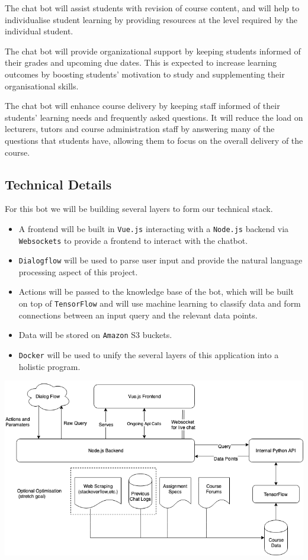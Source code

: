 \documentclass{article}
\begin{document}
The chat bot will assist students with revision of course content, and will help to individualise student learning by providing resources at the level required by the individual student.

The chat bot will provide organizational support by keeping students informed of their grades and upcoming due dates. This is expected to increase learning outcomes by boosting students' motivation to study and supplementing their organisational skills.

The chat bot will enhance course delivery by keeping staff informed of their students' learning needs and frequently asked questions. It will reduce the load on lecturers, tutors and course administration staff by answering many of the questions that students have, allowing them to focus on the overall delivery of the course. 


\subsection{Technical Details}

For this bot we will be building several layers to form our technical stack.

\begin{itemize}
  \item A frontend will be built in \texttt{Vue.js} interacting with a \texttt{Node.js} backend via \texttt{Websockets} to provide a frontend to interact with the chatbot.
  \item \texttt{Dialogflow} will be used to parse user input and provide the natural language processing aspect of this project.
  \item Actions will be passed to the knowledge base of the bot, which will be built on top of \texttt{TensorFlow} and will use machine learning to classify data and form connections between an input query and the relevant data points.
  \item Data will be stored on \texttt{Amazon} S3 buckets.
  \item \texttt{Docker} will be used to unify the several layers of this application into a holistic program. %
\end{itemize}

\begin{center}
  \includegraphics[width=\textwidth]{Architecture Diagram.png}
\end{center}
\end{document}

